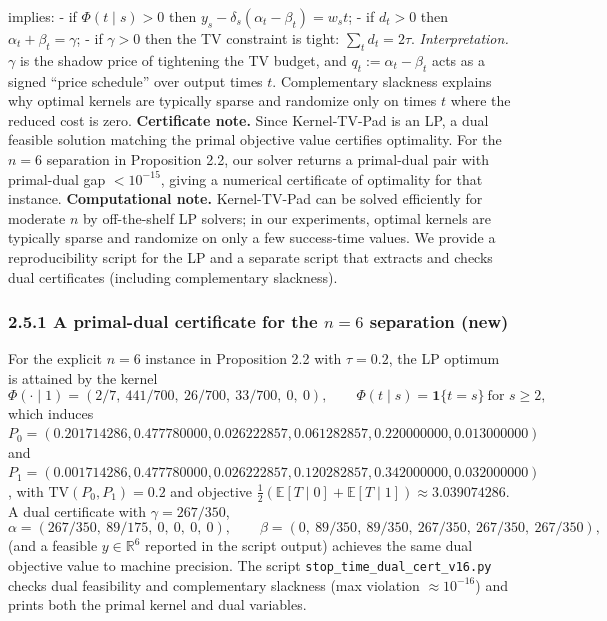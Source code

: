 \documentclass[11pt]{article}
\begin{document}
implies: - if \(\Phi(t\mid s)>0\) then
\(y_s-\delta_s(\alpha_t-\beta_t)=w_s t\); - if \(d_t>0\) then
\(\alpha_t+\beta_t=\gamma\); - if \(\gamma>0\) then the TV constraint is
tight: \(\sum_t d_t=2\tau\). \emph{Interpretation.} \(\gamma\) is the
shadow price of tightening the TV budget, and \(q_t:=\alpha_t-\beta_t\)
acts as a signed ``price schedule'' over output times \(t\).
Complementary slackness explains why optimal kernels are typically
sparse and randomize only on times \(t\) where the reduced cost is zero.
\textbf{Certificate note.} Since Kernel-TV-Pad is an LP, a dual feasible
solution matching the primal objective value certifies optimality. For
the \(n=6\) separation in Proposition 2.2, our solver returns a
primal-dual pair with primal-dual gap \(<10^{-15}\), giving a numerical
certificate of optimality for that instance. \textbf{Computational
note.} Kernel-TV-Pad can be solved efficiently for moderate \(n\) by
off-the-shelf LP solvers; in our experiments, optimal kernels are
typically sparse and randomize on only a few success-time values. We
provide a reproducibility script for the LP and a separate script that
extracts and checks dual certificates (including complementary
slackness).

\hypertarget{a-primal-dual-certificate-for-the-n6-separation-new}{%
\subsubsection{\texorpdfstring{2.5.1 A primal-dual certificate for the
\(n=6\) separation
(new)}{2.5.1 A primal-dual certificate for the n=6 separation (new)}}\label{a-primal-dual-certificate-for-the-n6-separation-new}}

For the explicit \(n=6\) instance in Proposition 2.2 with \(\tau=0.2\),
the LP optimum is attained by the kernel \[
\Phi(\cdot\mid 1)=(2/7,\ 441/700,\ 26/700,\ 33/700,\ 0,\ 0),\qquad \Phi(t\mid s)=\mathbf{1}\{t=s\}\ \text{for }s\ge 2,
\] which induces
\(P_0=(0.201714286,0.477780000,0.026222857,0.061282857,0.220000000,0.013000000)\)
and
\(P_1=(0.001714286,0.477780000,0.026222857,0.120282857,0.342000000,0.032000000)\),
with \(\mathrm{TV}(P_0,P_1)=0.2\) and objective
\(\tfrac12(\mathbb{E}[T\mid 0]+\mathbb{E}[T\mid 1])\approx 3.039074286\).
A dual certificate with \(\gamma=267/350\),
\[\alpha=(267/350,\ 89/175,\ 0,\ 0,\ 0,\ 0),\qquad
\beta=(0,\ 89/350,\ 89/350,\ 267/350,\ 267/350,\ 267/350),\] (and a
feasible \(y\in\mathbb{R}^6\) reported in the script output) achieves
the same dual objective value to machine precision. The script
\texttt{stop\_time\_dual\_cert\_v16.py} checks dual feasibility and
complementary slackness (max violation \(\approx 10^{-16}\)) and prints
both the primal kernel and dual variables.
\end{document}
